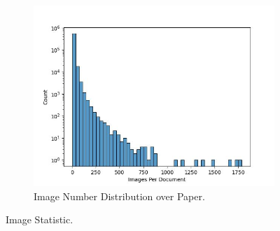 
\begin{figure}[tp]
  \centering
  \begin{subfigure}{0.45\textwidth}
    \centering
    \includegraphics[width=\textwidth]{figs/data-statistic/n_images_by_paper.jpg}
    \caption{Image Number Distribution over Paper.}
    \label{fig:subfig1}
  \end{subfigure}
  \hfill
  \caption{Image Statistic.}
  \label{fig:image-statistic}
\end{figure}